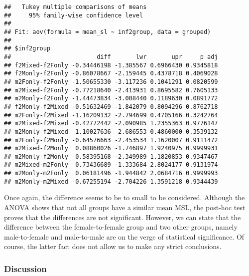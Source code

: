\documentclass[
]{article}
\begin{document}
\begin{verbatim}
##   Tukey multiple comparisons of means
##     95% family-wise confidence level
## 
## Fit: aov(formula = mean_sl ~ inf2group, data = grouped)
## 
## $inf2group
##                        diff       lwr       upr     p adj
## f2Mixed-f2Fonly -0.34446198 -1.385567 0.6966430 0.9345818
## f2Monly-f2Fonly -0.86078667 -2.159445 0.4378718 0.4069028
## m2Fonly-f2Fonly -1.50655330 -3.117236 0.1041291 0.0820599
## m2Mixed-f2Fonly -0.77218640 -2.413931 0.8695582 0.7605133
## m2Monly-f2Fonly -1.44473834 -3.008440 0.1189630 0.0891772
## f2Monly-f2Mixed -0.51632469 -1.842079 0.8094296 0.8762718
## m2Fonly-f2Mixed -1.16209132 -2.794699 0.4705166 0.3242764
## m2Mixed-f2Mixed -0.42772442 -2.090985 1.2355363 0.9776147
## m2Monly-f2Mixed -1.10027636 -2.686553 0.4860000 0.3539132
## m2Fonly-f2Monly -0.64576663 -2.453534 1.1620007 0.9111472
## m2Mixed-f2Monly  0.08860026 -1.746897 1.9240975 0.9999931
## m2Monly-f2Monly -0.58395168 -2.349989 1.1820853 0.9347467
## m2Mixed-m2Fonly  0.73436689 -1.333684 2.8024177 0.9131974
## m2Monly-m2Fonly  0.06181496 -1.944842 2.0684716 0.9999993
## m2Monly-m2Mixed -0.67255194 -2.704226 1.3591218 0.9344439
\end{verbatim}

Once again, the difference seems to be to small to be considered.
Although the ANOVA shows that not all groups have a similar mean MSL,
the post-hoc test proves that the differences are not significant.
However, we can state that the difference between the female-to-female
group and two other groups, namely male-to-female and male-to-male are
on the verge of statistical significance. Of course, the latter fact
does not allow us to make any strict conclusions.

\hypertarget{discussion}{%
\subsubsection{Discussion}\label{discussion}}
\end{document}
